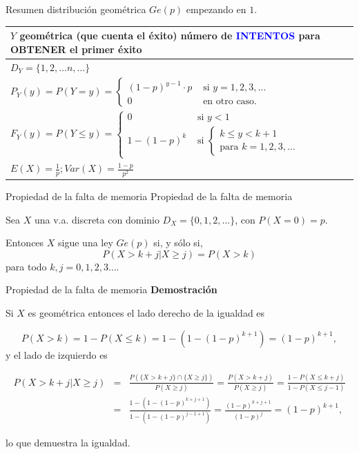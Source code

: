 \documentclass[
  ignorenonframetext,
  aspectratio=169]{beamer}
\newcommand\blue[1]{\textcolor{blue}{#1}}
\begin{document}
\begin{frame}{Resumen distribución geométrica \(Ge(p)\) empezando en
\(1\).}
\protect\hypertarget{resumen-distribuciuxf3n-geomuxe9trica-gep-empezando-en-1.}{}
\renewcommand{\arraystretch}{1.75}
\begin{table}
\centering
\begin{tabular}{|l|}
\hline\rowcolor{LightBlue}
$Y$ geométrica (que cuenta el éxito) número de \blue{INTENTOS}  para OBTENER el primer éxito
\\\hline
$D_Y=\{1,2,\ldots n,\ldots\}$ \\\hline
$P_Y(y)=P(Y=y)=\left\{\begin{array}{ll}(1-p)^{y-1}\cdot p & \mbox{ si } y=1,2,3,\ldots\\  0  & \mbox{ en otro caso.}\end{array}\right.$\\\hline
$F_Y(y)=P(Y\leq y)=\left\{\begin{array}{ll} 0 & \mbox{ si } y<1\\ 1- (1-p)^{k} & \mbox{ si } \left\{ \begin{array}{l}k\leq y< k+1\\\mbox{para } k=1,2,3,\dots \end{array}    \right.\end{array}\right.$ \\\hline
$E(X)=\frac1{p}; Var(X)=\frac{1-p}{p^2}$
\\\hline
\end{tabular}
\end{table}
\end{frame}

\begin{frame}{Propiedad de la falta de memoria}
\protect\hypertarget{propiedad-de-la-falta-de-memoria}{}
Propiedad de la falta de memoria

Sea \(X\) una v.a. discreta con dominio \(D_X=\{0,1,2,\ldots\}\), con
\(P(X=0)=p\).

Entonces \(X\) sigue una ley \(Ge(p)\) si, y sólo si, \[
P\left(X> k+j\big| X\geq j\right)=P(X> k)
\] para todo \(k,j=0,1,2,3\ldots\).
\end{frame}

\begin{frame}{Propiedad de la falta de memoria}
\protect\hypertarget{propiedad-de-la-falta-de-memoria-1}{}
\textbf{Demostración}

Si \(X\) es geométrica entonces el lado derecho de la igualdad es

\[
P(X>k)=1-P(X\leq k)=1-\left(1-(1-p)^{k+1}\right)=(1-p)^{k+1},
\] y el lado de izquierdo es

\begin{eqnarray*} 
P\left(X> k+j\big| X\geq j\right)&=&\frac{P\left(\{X> k+j\}\cap \{X\geq j\} \right)}{P\left(X\geq j\right)}=
\frac{P\left(X>k+j \right)}{P\left(X\geq j \right)} = \frac{1-P(X\leq k+j)}{1-P(X\leq j-1)}\\
&=&  \frac{1-(1-(1-p)^{k+j+1})}{1-(1-(1-p)^{j-1+1})} =\frac{(1-p)^{k+j+1}}{(1-p)^{j}} = (1-p)^{k+1},
\end{eqnarray*}

lo que demuestra la igualdad.
\end{frame}
\end{document}
